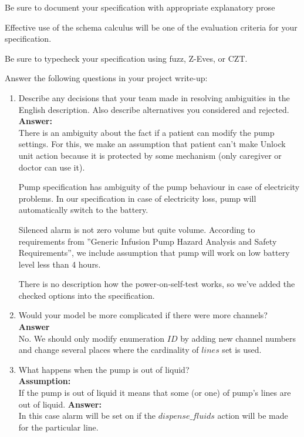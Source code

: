 \documentclass{article}
\begin{document}
\bigskip Be sure to document your specification with appropriate explanatory prose

\bigskip Effective use of the schema calculus will be one of the evaluation criteria for your specification.

\bigskip Be sure to typecheck your specification using fuzz,
Z-Eves, or CZT.

\bigskip Answer the following questions in your project write-up:
\begin{enumerate}
    \item Describe any decisions that your team made in resolving
    ambiguities in the English description. Also describe
    alternatives you considered and rejected.
    \\
    \textbf{Answer:}\\
    
   There is an ambiguity about the fact if a patient can modify the pump settings. For this, we make an assumption that patient can't make Unlock unit action because it is protected by some mechanism (only caregiver or doctor can use it).
    
    Pump specification has ambiguity of the pump behaviour in case of electricity problems. In our specification in case of electricity loss, pump will automatically switch to the battery.
    
    Silenced alarm is not zero volume but quite volume.
    According to requirements from ”Generic Infusion Pump Hazard Analysis and Safety Requirements”, we include assumption that pump will work on low battery level less than 4 hours.
    
	There is no description how the power-on-self-test works, so we've added the checked options into the specification.
 
    \item Would your model be more complicated if there were more
    channels?
    \\
    \textbf{Answer}\\
    No. We should only modify enumeration $ID$ by adding new channel numbers and change several places where the cardinality of $lines$ set is used.
    \item What happens when the pump is out of liquid?
    \\
    \textbf{Assumption:}\\
    If the pump is out of liquid it means that some (or one) of pump's lines are out of liquid.
    \textbf{Answer:}\\
    In this case alarm will be set on if the $dispense\_fluids$ action will be made for the particular line.
    

\end{enumerate}
\end{document}
